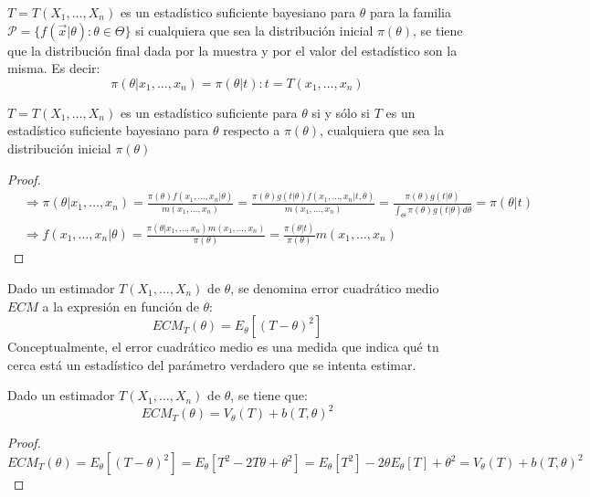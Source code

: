 \begin{definición}
$T = T(X_1, \ldots, X_n)$ es un estadístico suficiente bayesiano para $\theta$ para la familia $\mathcal{P} = \{f(\vec{x}|\theta) : \theta \in \Theta\}$ si cualquiera que sea la distribución inicial $\pi(\theta)$, se tiene que la distribución final dada por la muestra y por el valor del estadístico son la misma. Es decir:
$$\pi(\theta | x_1, \ldots, x_n) = \pi(\theta | t) : t = T(x_1, \ldots, x_n)$$
\end{definición}

\begin{teorema}
  $T = T(X_1, \ldots, X_n)$ es un estadístico suficiente para $\theta$ si y sólo si $T$ es un estadístico suficiente bayesiano para $\theta$ respecto a $\pi(\theta)$, cualquiera que sea la distribución inicial $\pi(\theta)$
\end{teorema}

\begin{proof}
  $$\begin{aligned}
       & \Rightarrow \pi(\theta | x_1, \ldots, x_n) = \frac{\pi(\theta)f(x_1, \ldots, x_n | \theta)}{m(x_1, \ldots, x_n)} = \frac{\pi(\theta)g(t | \theta)f(x_1, \ldots, x_n | t, \theta)}{m(x_1, \ldots, x_n)} = \frac{\pi(\theta)g(t | \theta)}{\int_{\Theta}\pi(\theta)g(t | \theta)d\theta} = \pi(\theta | t) \\
       & \Rightarrow f(x_1, \ldots, x_n | \theta) = \frac{\pi(\theta | x_1, \ldots, x_n)m(x_1, \ldots, x_n)}{\pi(\theta)} = \frac{\pi(\theta | t)}{\pi(\theta)}m(x_1, \ldots, x_n)
    \end{aligned}$$
\end{proof}

\begin{definición}
Dado un estimador $T(X_1, \ldots, X_n)$ de $\theta$, se denomina error cuadrático medio $ECM$ a la expresión en función de $\theta$:
$$ECM_T(\theta) = E_{\theta}[(T - \theta)^2]$$
Conceptualmente, el error cuadrático medio es una medida que indica qué tn cerca está un estadístico del parámetro verdadero que se intenta estimar.
\end{definición}

\begin{proposición}
Dado un estimador $T(X_1, \ldots, X_n)$ de $\theta$, se tiene que:
$$ECM_T(\theta) = V_{\theta}(T) + b(T, \theta)^2$$
\end{proposición}
\begin{proof}
  $$ECM_T(\theta) = E_{\theta}[(T - \theta)^2] = E_{\theta}[T^2 - 2T\theta + \theta^2] = E_{\theta}[T^2] - 2\theta E_{\theta}[T] + \theta^2 = V_{\theta}(T) + b(T, \theta)^2$$
\end{proof}

